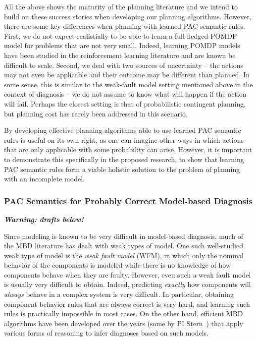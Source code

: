 \documentclass[12pt]{article}
\newcommand{\note}[1]{\textbf{\textit{#1}}}
\begin{document}
All the above shows the maturity of the planning literature 
and we intend to build on these success stories when developing our  planning algorithms. However, there are some key differences 
when planning with learned PAC semantic rules. First, we do not expect realistially to be able to learn a full-fledged POMDP model for problems that are not very small. Indeed, learning POMDP models have been studied in the reinforcement learning literature and are known be difficult to scale. 
Second, we deal with two sources of uncertainty -- the actions may not even be applicable and their outcome may be different than planned. In some sense, this is similar to the weak-fault model setting mentioned above in the context of diagnosis -- we do not assume to know what will happen if the action will fail. Perhaps the closest setting is that of probabilistic contingent planning, but planning cost has rarely been addressed in this scenario. 


By developing effective planning algorithms able to use learned PAC semantic rules is useful on its own right, as one can imagine other ways in which actions that are only applicable with some probability can arise. However, 
it is important to demonstrate this specifically in the proposed research, to show that learning PAC semantic rules form a viable holistic solution to the problem of planning with an incomplete model. 










\subsubsection{PAC Semantics for Probably Correct Model-based Diagnosis}
\note{Warning: drafts below!}


Since modeling is known to be very difficult in model-based diagnosis, much of the MBD literature has dealt with weak types of model. One such well-studied weak type of model is the {\em weak fault model} (WFM), in which only the nominal behavior of the components is modeled while there is no knowledge of how components behave when they are faulty. However, even such a weak fault model is usually very difficult to obtain. Indeed, predicting {\em exactly} how components will {\em always} behave in a complex system is very difficult. In particular, obtaining component behavior rules that are always correct is very hard, and learning such rules is practically impossible in most cases. 
On the other hand, efficient MBD algorithms have been developed over the years (some by PI Stern~\cite{metodi2014novel,stern2012exploring,stern2014hierarchical,elmishali2016dataAugmented,lazebnik2016solving}) that apply various forms of reasoning to infer diagnoses based on such models. 
\end{document}
